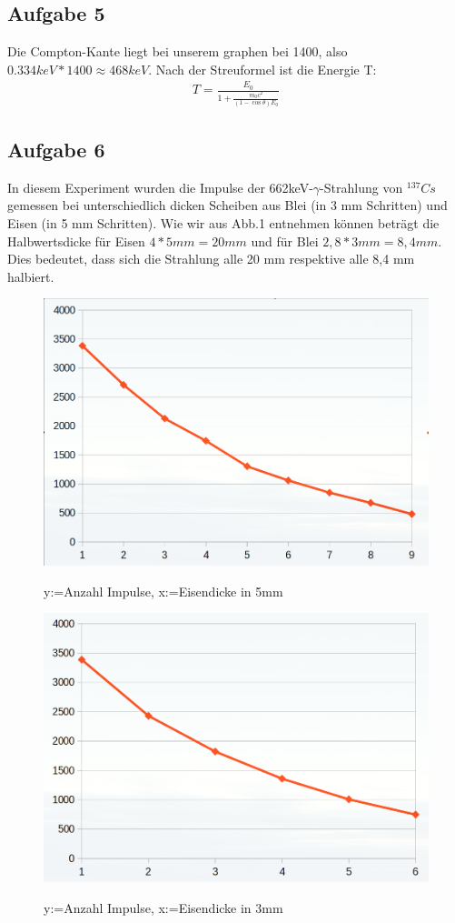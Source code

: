 \documentclass[11pt,a4paper]{article}
\begin{document}
  \subsection{Aufgabe 5}
   Die Compton-Kante liegt bei unserem graphen bei 1400, also $0.334keV * 1400 \approx 468keV$.
   Nach der Streuformel ist die Energie T:
    \begin{align}
     T=\frac{{E}_{0}}{1+\frac{{m}_{0}c^{2}}{(1-\cos\theta){E}_{0}}}
     \end{align}
  \subsection{Aufgabe 6}
   In diesem Experiment wurden die Impulse der 662keV-$\gamma$-Strahlung von $^{137}{Cs}$ gemessen
   bei unterschiedlich dicken Scheiben aus Blei (in 3 mm Schritten) und Eisen (in 5 mm Schritten).
   Wie wir aus Abb.1 entnehmen k\"onnen betr\"agt die Halbwertsdicke f\"ur Eisen $4*5mm=20mm$ und 
   f\"ur Blei $2,8*3 mm = 8,4 mm$. Dies bedeutet, dass sich die Strahlung alle 20 mm respektive alle
   8,4 mm halbiert.\\
   \begin{figure}
       \caption{y:=Anzahl Impulse, x:=Eisendicke in 5mm}
       \centering
       \includegraphics[scale=0.5]{Bilder/eisen.png} \\
   \end{figure}
    \begin{figure}
       \caption{y:=Anzahl Impulse, x:=Eisendicke in 3mm}
       \centering
       \includegraphics[scale=0.5]{Bilder/blei.png} \\
   \end{figure}
\end{document}
